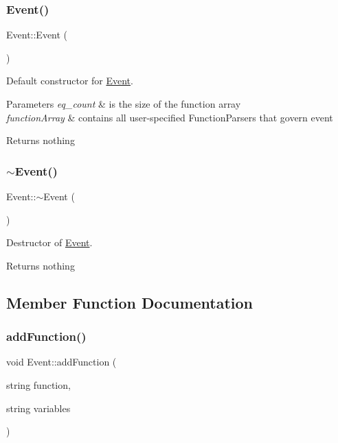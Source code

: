 \subsubsection{\texorpdfstring{Event()}{Event()}}
{\footnotesize\ttfamily Event\+::\+Event (\begin{DoxyParamCaption}{ }\end{DoxyParamCaption})}



Default constructor for \hyperlink{class_event}{Event}. 


\begin{DoxyParams}{Parameters}
{\em eq\+\_\+count} & is the size of the function array \\
\hline
{\em function\+Array} & contains all user-\/specified Function\+Parsers that govern event \\
\hline
\end{DoxyParams}
\begin{DoxyReturn}{Returns}
nothing 
\end{DoxyReturn}
\mbox{\label{class_event_a7704ec01ce91e673885792054214b3d2}} 
\subsubsection{\texorpdfstring{$\sim$\+Event()}{~Event()}}
{\footnotesize\ttfamily Event\+::$\sim$\+Event (\begin{DoxyParamCaption}{ }\end{DoxyParamCaption})}



Destructor of \hyperlink{class_event}{Event}. 

\begin{DoxyReturn}{Returns}
nothing 
\end{DoxyReturn}


\subsection{Member Function Documentation}
\mbox{\label{class_event_ad380e41418d2e34b651e052711fefe83}} 
\subsubsection{\texorpdfstring{add\+Function()}{addFunction()}}
{\footnotesize\ttfamily void Event\+::add\+Function (\begin{DoxyParamCaption}\item[{string}]{function,  }\item[{string}]{variables }\end{DoxyParamCaption})}



